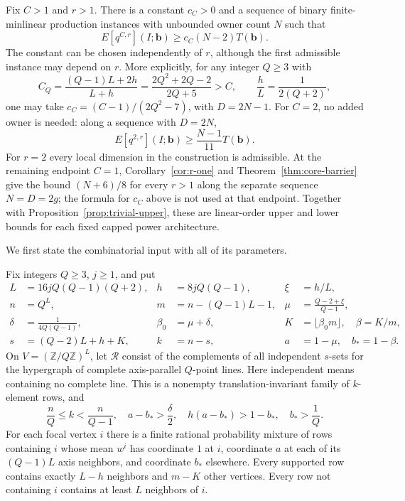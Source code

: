 \begin{theorem}
\label{thm:fixed-cap}
Fix $C>1$ and $r>1$.  There is a constant $c_C>0$ and a sequence of
binary finite-minlinear production instances with unbounded owner count
$N$ such that
\[
 E[q^{C,r}](I;\mathbf b)\ge c_C(N-2)T(\mathbf b).
\]
The constant can be chosen independently of $r$, although the first
admissible instance may depend on $r$.  More explicitly, for any integer
$Q\ge3$ with
\begin{equation}
 C_Q=\frac{(Q-1)L+2h}{L+h}
     =\frac{2Q^2+2Q-2}{2Q+5}>C,
 \qquad \frac hL=\frac1{2(Q+2)},
 \label{eq:natural-cap}
\end{equation}
one may take $c_C=(C-1)/(2Q^2-7)$, with $D=2N-1$.
For $C=2$, no added owner is needed: along a sequence with $D=2N$,
\begin{equation}
 E[q^{2,r}](I;\mathbf b)\ge\frac{N-1}{11}T(\mathbf b).
 \label{eq:cap-two-eleventh}
\end{equation}
For $r=2$ every local dimension in the construction is admissible.
At the remaining endpoint $C=1$, Corollary~\ref{cor:r-one} and
Theorem~\ref{thm:core-barrier} give the bound $(N+6)/8$ for every $r>1$
along the separate sequence $N=D=2g$; the formula for $c_C$ above is
not used at that endpoint.
Together with Proposition~\ref{prop:trivial-upper}, these are linear-order
upper and lower bounds for each fixed capped power architecture.
\end{theorem}

We first state the combinatorial input with all of its parameters.

\begin{lemma}
\label{lem:qary-input}
Fix integers $Q\ge3$, $j\ge1$, and put
\begin{align*}
 L&=16jQ(Q-1)(Q+2),& h&=8jQ(Q-1),& \xi&=h/L,\\
 n&=Q^L,& m&=n-(Q-1)L-1,&
 \mu&=\frac{Q-2+\xi}{Q-1},\\
 \delta&=\frac1{4Q(Q-1)},& \beta_0&=\mu+\delta,&
 K&=\lfloor\beta_0m\rfloor,\quad \beta=K/m,\\
 s&=(Q-2)L+h+K,& k&=n-s,& a&=1-\mu,\quad b_*=1-\beta.
\end{align*}
On $V=(\mathbb Z/Q\mathbb Z)^L$, let $\mathcal R$ consist of the
complements of all independent $s$-sets for the hypergraph of complete
axis-parallel $Q$-point lines.  Here independent means containing no
complete line.  This is a nonempty translation-invariant family of
$k$-element rows, and
\begin{equation}
 \frac nQ\le k<\frac n{Q-1},\quad
 a-b_*>\frac\delta2,\quad
 h(a-b_*)>1-b_*,\quad b_*>\frac1Q.
 \label{eq:qary-margins}
\end{equation}
For each focal vertex $i$ there is a finite rational probability mixture
of rows containing $i$ whose mean $w^i$ has coordinate $1$ at $i$,
coordinate $a$ at each of its $(Q-1)L$ axis neighbors, and coordinate
$b_*$ elsewhere.  Every supported row contains exactly $L-h$ neighbors
and $m-K$ other vertices.  Every row not containing $i$ contains at least
$L$ neighbors of $i$.
\end{lemma}

